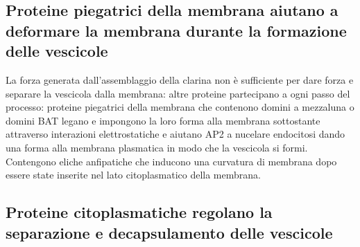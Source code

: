 \subsection{Proteine piegatrici della membrana aiutano a deformare la membrana durante la formazione delle vescicole}
La forza generata dall'assemblaggio della clarina non \`e sufficiente per dare forza e separare la vescicola dalla membrana: altre proteine partecipano a ogni passo del processo:
proteine piegatrici della membrana che contenono  domini a mezzaluna o domini BAT legano e impongono la loro forma alla membrana sottostante attraverso interazioni elettrostatiche e 
aiutano AP2 a nucelare endocitosi dando una forma alla membrana plasmatica in modo che la vescicola si formi. Contengono eliche anfipatiche che inducono una curvatura di membrana
dopo essere state inserite nel lato citoplasmatico della membrana.
\subsection{Proteine citoplasmatiche regolano la separazione e decapsulamento delle vescicole}
